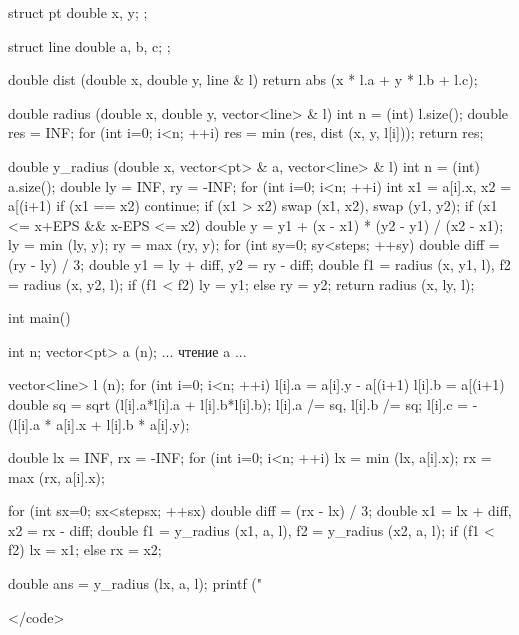 struct pt {
	double x, y;
};

struct line {
	double a, b, c;
};

double dist (double x, double y, line & l) {
	return abs (x * l.a + y * l.b + l.c);
}

double radius (double x, double y, vector<line> & l) {
	int n = (int) l.size();
	double res = INF;
	for (int i=0; i<n; ++i)
		res = min (res, dist (x, y, l[i]));
	return res;
}

double y_radius (double x, vector<pt> & a, vector<line> & l) {
	int n = (int) a.size();
	double ly = INF,  ry = -INF;
	for (int i=0; i<n; ++i) {
		int x1 = a[i].x,  x2 = a[(i+1)%
		if (x1 == x2)  continue;
		if (x1 > x2)  swap (x1, x2),  swap (y1, y2);
		if (x1 <= x+EPS && x-EPS <= x2) {
			double y = y1 + (x - x1) * (y2 - y1) / (x2 - x1);
			ly = min (ly, y);
			ry = max (ry, y);
		}
	}
	for (int sy=0; sy<steps; ++sy) {
		double diff = (ry - ly) / 3;
		double y1 = ly + diff,  y2 = ry - diff;
		double f1 = radius (x, y1, l),  f2 = radius (x, y2, l);
		if (f1 < f2)
			ly = y1;
		else
			ry = y2;
	}
	return radius (x, ly, l);
}

int main() {

	int n;
	vector<pt> a (n);
	... чтение a ...

	vector<line> l (n);
	for (int i=0; i<n; ++i) {
		l[i].a = a[i].y - a[(i+1)%
		l[i].b = a[(i+1)%
		double sq = sqrt (l[i].a*l[i].a + l[i].b*l[i].b);
		l[i].a /= sq,  l[i].b /= sq;
		l[i].c = - (l[i].a * a[i].x + l[i].b * a[i].y);
	}

	double lx = INF,  rx = -INF;
	for (int i=0; i<n; ++i) {
		lx = min (lx, a[i].x);
		rx = max (rx, a[i].x);
	}

	for (int sx=0; sx<stepsx; ++sx) {
		double diff = (rx - lx) / 3;
		double x1 = lx + diff,  x2 = rx - diff;
		double f1 = y_radius (x1, a, l),  f2 = y_radius (x2, a, l);
		if (f1 < f2)
			lx = x1;
		else
			rx = x2;
	}

	double ans = y_radius (lx, a, l);
	printf ("%

}</code>